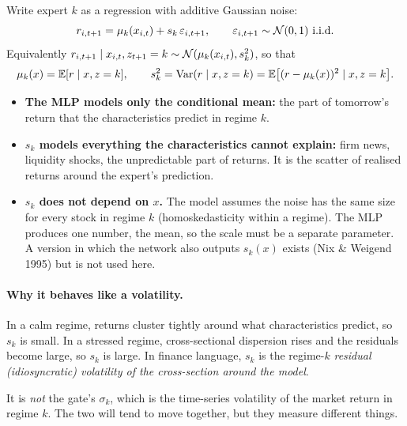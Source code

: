 Write expert $k$ as a regression with additive Gaussian noise:
\begin{equation}
r_{i,t+1}=\mu_k(x_{i,t})+s_k\,\varepsilon_{i,t+1},\qquad \varepsilon_{i,t+1}\sim\mathcal{N}(0,1)\ \text{i.i.d.}
\end{equation}
Equivalently $r_{i,t+1}\mid x_{i,t},z_{t+1}=k\sim\mathcal{N}(\mu_k(x_{i,t}),s_k^2)$, so that
\begin{equation}
\mu_k(x)=\mathbb{E}[r\mid x,z=k],\qquad s_k^2=\operatorname{Var}(r\mid x,z=k)=\mathbb{E}\big[(r-\mu_k(x))^2\mid x,z=k\big].
\end{equation}

\begin{itemize}
  \item \textbf{The MLP models only the conditional mean:} the part of tomorrow's return that the characteristics predict in regime $k$.
  \item \textbf{$s_k$ models everything the characteristics cannot explain:} firm news, liquidity shocks, the unpredictable part of returns. It is the scatter of realised returns around the expert's prediction.
  \item \textbf{$s_k$ does not depend on $x$.} The model assumes the noise has the same size for every stock in regime $k$ (homoskedasticity within a regime). The MLP produces one number, the mean, so the scale must be a separate parameter. A version in which the network also outputs $s_k(x)$ exists (Nix \& Weigend 1995) but is not used here.
\end{itemize}

\paragraph{Why it behaves like a volatility.} In a calm regime, returns cluster tightly around what characteristics predict, so $s_k$ is small. In a stressed regime, cross-sectional dispersion rises and the residuals become large, so $s_k$ is large. In finance language, $s_k$ is the regime-$k$ \emph{residual (idiosyncratic) volatility of the cross-section around the model}.

It is \emph{not} the gate's $\sigma_k$, which is the time-series volatility of the market return in regime $k$. The two will tend to move together, but they measure different things.

